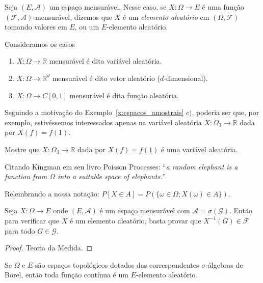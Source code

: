 \documentclass[../main/Notas_de_aula.tex]{subfiles}
\begin{document}
Seja $(E,\mathcal{A})$ um espaço mensurável.
Nesse caso, se $X: \Omega \to E$ é uma função $(\mathcal{F}, \mathcal{A})$-mensurável, dizemos que $X$ é um \emph{elemento aleatório}  em $(\Omega, \mathcal{F})$ tomando valores em $E$, ou um $E$-elemento aleatório.

\begin{example} Consideramos os casos
  \begin{enumerate}[\quad a)]
  \item $X:\Omega \to \mathbb{R}$ mensurável é dita variável aleatória. 
  \item $X:\Omega \to \mathbb{R}^d$ mensurável é dito vetor aleatório ($d$-dimensional).
  \item $X:\Omega \to C[0,1]$ mensurável é dita função aleatória.
  \end{enumerate}
\end{example}
Seguindo a motivação do Exemplo~\ref{x:espacos_amostrais} $c)$, poderia ser que, por exemplo, estivéssemos interessados apenas na variável aleatória $X:\Omega_3 \to \mathbb{R}$ dada por $X(f) = f(1)$.

\begin{exercise}
  Mostre que $X:\Omega_3 \to \mathbb{R}$ dada por $X(f) = f(1)$ é uma variável aleatória.
\end{exercise}

Citando Kingman em seu livro Poisson Processes: ``\emph{a random elephant is a function from $\Omega$ into a suitable space of elephants.}''

Relembrando a nossa notação: $P[X \in A] = P(\{\omega \in \Omega; X(\omega) \in A\})$.

\begin{proposition}
  Seja $X:\Omega \to E$ onde $(E, \mathcal{A})$ é um espaço mensurável com $\mathcal{A} = \sigma(\mathcal{G})$.
  Então para verificar que $X$ é um elemento aleatório, basta provar que $X^{-1}(G) \in \mathcal{F}$ para todo $G \in \mathcal{G}$.
\end{proposition}

\begin{proof}
  Teoria da Medida.
\end{proof}

\begin{example}
  Se $\Omega$ e $E$ são espaços topológicos dotados das correspondentes $\sigma$-álgebras de Borel, então toda função contínua é um $E$-elemento aleatório.
\end{example}
\end{document}
